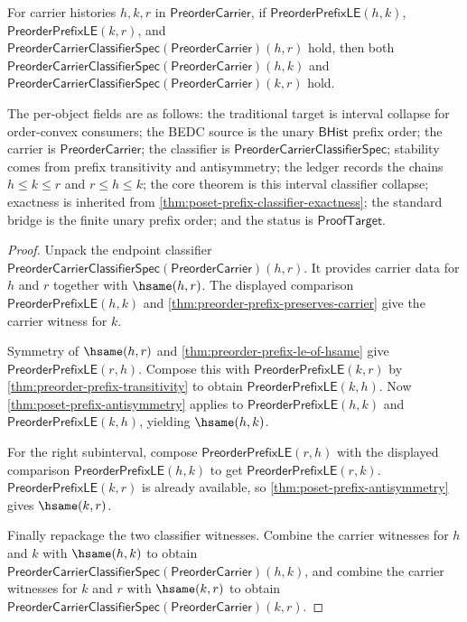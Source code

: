 \begin{theorem}
\label{thm:poset-prefix-interval-classifier-collapse}
For carrier histories $h,k,r$ in $\mathsf{PreorderCarrier}$, if
$\mathsf{PreorderPrefixLE}(h,k)$, $\mathsf{PreorderPrefixLE}(k,r)$, and
$\mathsf{PreorderCarrierClassifierSpec}(\mathsf{PreorderCarrier})(h,r)$ hold,
then both
$\mathsf{PreorderCarrierClassifierSpec}(\mathsf{PreorderCarrier})(h,k)$ and
$\mathsf{PreorderCarrierClassifierSpec}(\mathsf{PreorderCarrier})(k,r)$ hold.

The per-object fields are as follows: the traditional target is interval
collapse for order-convex consumers; the BEDC source is the unary
$\mathsf{BHist}$ prefix order; the carrier is $\mathsf{PreorderCarrier}$; the
classifier is $\mathsf{PreorderCarrierClassifierSpec}$; stability comes from
prefix transitivity and antisymmetry; the ledger records the chains
$h\le k\le r$ and $r\le h\le k$; the core theorem is this interval classifier
collapse; exactness is inherited from
\autoref{thm:poset-prefix-classifier-exactness}; the standard bridge is the
finite unary prefix order; and the status is $\mathsf{ProofTarget}$.
\end{theorem}
\begin{proof}
Unpack the endpoint classifier
$\mathsf{PreorderCarrierClassifierSpec}(\mathsf{PreorderCarrier})(h,r)$. It
provides carrier data for $h$ and $r$ together with $\hsame(h,r)$. The displayed
comparison $\mathsf{PreorderPrefixLE}(h,k)$ and
\autoref{thm:preorder-prefix-preserves-carrier} give the carrier witness for
$k$.

Symmetry of $\hsame(h,r)$ and \autoref{thm:preorder-prefix-le-of-hsame} give
$\mathsf{PreorderPrefixLE}(r,h)$. Compose this with
$\mathsf{PreorderPrefixLE}(k,r)$ by
\autoref{thm:preorder-prefix-transitivity} to obtain
$\mathsf{PreorderPrefixLE}(k,h)$. Now
\autoref{thm:poset-prefix-antisymmetry} applies to
$\mathsf{PreorderPrefixLE}(h,k)$ and $\mathsf{PreorderPrefixLE}(k,h)$, yielding
$\hsame(h,k)$.

For the right subinterval, compose
$\mathsf{PreorderPrefixLE}(r,h)$ with the displayed comparison
$\mathsf{PreorderPrefixLE}(h,k)$ to get $\mathsf{PreorderPrefixLE}(r,k)$.
$\mathsf{PreorderPrefixLE}(k,r)$ is already available, so
\autoref{thm:poset-prefix-antisymmetry} gives $\hsame(k,r)$.

Finally repackage the two classifier witnesses. Combine the carrier witnesses
for $h$ and $k$ with $\hsame(h,k)$ to obtain
$\mathsf{PreorderCarrierClassifierSpec}(\mathsf{PreorderCarrier})(h,k)$, and
combine the carrier witnesses for $k$ and $r$ with $\hsame(k,r)$ to obtain
$\mathsf{PreorderCarrierClassifierSpec}(\mathsf{PreorderCarrier})(k,r)$.
\end{proof}

